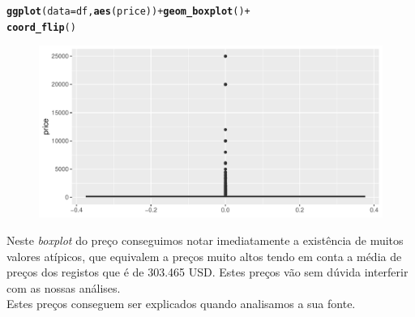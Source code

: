 \documentclass[justified, 11pt]{scrartcl}\usepackage[]{graphicx}\usepackage[]{xcolor}
\makeatletter
\def\maxwidth{ %
  \ifdim\Gin@nat@width>\linewidth
    \linewidth
  \else
    \Gin@nat@width
  \fi
}
\newcommand{\hlopt}[1]{\textcolor[rgb]{0,0,0}{#1}}%
\newcommand{\hlstd}[1]{\textcolor[rgb]{0.345,0.345,0.345}{#1}}%
\newcommand{\hlkwc}[1]{\textcolor[rgb]{0.333,0.667,0.333}{#1}}%
\newcommand{\hlkwd}[1]{\textcolor[rgb]{0.737,0.353,0.396}{\textbf{#1}}}%
\newenvironment{kframe}{%
 \def\at@end@of@kframe{}%
 \ifinner\ifhmode%
  \def\at@end@of@kframe{\end{minipage}}%
  \begin{minipage}{\columnwidth}%
 \fi\fi%
 \def\FrameCommand##1{\hskip\@totalleftmargin \hskip-\fboxsep
 \colorbox{shadecolor}{##1}\hskip-\fboxsep
     \hskip-\linewidth \hskip-\@totalleftmargin \hskip\columnwidth}%
 \MakeFramed {\advance\hsize-\width
   \@totalleftmargin\z@ \linewidth\hsize
   \@setminipage}}%
 {\par\unskip\endMakeFramed%
 \at@end@of@kframe}
\newenvironment{knitrout}{}{} %
\makeatother
\begin{document}
\begin{knitrout}
\color{fgcolor}\begin{kframe}
\begin{alltt}
\hlkwd{ggplot}\hlstd{(}\hlkwc{data} \hlstd{= df,} \hlkwd{aes}\hlstd{(price))} \hlopt{+} \hlkwd{geom_boxplot}\hlstd{()} \hlopt{+}
    \hlkwd{coord_flip}\hlstd{()}
\end{alltt}
\end{kframe}\begin{figure}
\includegraphics[width=\maxwidth]{figure/chunk-priceBoxPlot-1} \end{figure}

\end{knitrout}
Neste \textit{boxplot} do preço conseguimos notar imediatamente a existência de muitos valores atípicos, que equivalem a preços muito altos tendo em conta a média de preços dos registos que é de 303.465 USD. Estes preços vão sem dúvida interferir com as nossas análises. \\
Estes preços conseguem ser explicados quando analisamos a sua fonte.
\end{document}
